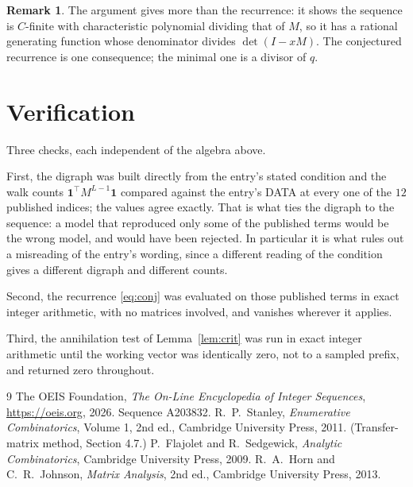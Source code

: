 \documentclass[11pt,a4paper]{article}
\theoremstyle{plain}
\theoremstyle{definition}
\newtheorem{remark}[theorem]{Remark}
\begin{document}
\begin{remark}
The argument gives more than the recurrence: it shows the sequence is $C$-finite with
characteristic polynomial dividing that of $M$, so it has a rational generating function
whose denominator divides $\det(I-xM)$. The conjectured recurrence is one consequence; the
minimal one is a divisor of $q$.
\end{remark}

\section{Verification}

Three checks, each independent of the algebra above.

First, the digraph was built directly from the entry's stated condition and the walk counts
$\mathbf{1}^{\!\top}M^{L-1}\mathbf{1}$ compared against the entry's DATA at
every one of the $12$ published indices; the values agree exactly. That is what ties
the digraph to the sequence: a model that reproduced only some of the published terms would
be the wrong model, and would have been rejected. In particular it is what rules out a
misreading of the entry's wording, since a different reading of the condition gives a
different digraph and different counts.

Second, the recurrence \eqref{eq:conj} was evaluated on those published terms in exact
integer arithmetic, with no matrices involved, and vanishes wherever it applies.

Third, the annihilation test of Lemma~\ref{lem:crit} was run in exact integer arithmetic
until the working vector was identically zero, not to a sampled prefix, and returned zero
throughout.

\begin{thebibliography}{9}
 The OEIS Foundation, \emph{The On-Line Encyclopedia of Integer
Sequences}, \url{https://oeis.org}, 2026. Sequence A203832.
 R.~P.~Stanley, \emph{Enumerative Combinatorics}, Volume 1, 2nd ed.,
Cambridge University Press, 2011. (Transfer-matrix method, Section 4.7.)
 P.~Flajolet and R.~Sedgewick, \emph{Analytic Combinatorics}, Cambridge
University Press, 2009.
 R.~A.~Horn and C.~R.~Johnson, \emph{Matrix Analysis}, 2nd ed., Cambridge
University Press, 2013.
\end{thebibliography}
\end{document}
